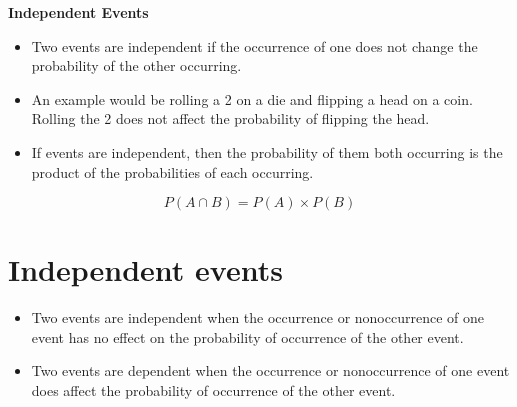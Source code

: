 \documentclass[]{report}
\begin{document}








\noindent \textbf{Independent Events}

\begin{itemize}
\item Two events are independent if the occurrence of one does not change the probability of the other occurring.
\item An example would be rolling a 2 on a die and flipping a head on a coin. Rolling the 2 does not affect the probability of flipping the head.
\item If events are independent, then the probability of them both occurring is the product of the probabilities of each occurring.
\end{itemize}
\[P(A \cap B) = P(A) \times P(B)\]



\section*{Independent events}

\begin{itemize}
\item Two events are independent when the occurrence or nonoccurrence of one event has no effect on the
probability of occurrence of the other event. 

\item Two events are dependent when the occurrence or nonoccurrence
of one event does affect the probability of occurrence of the other event.
\end{itemize}



\end{document}
